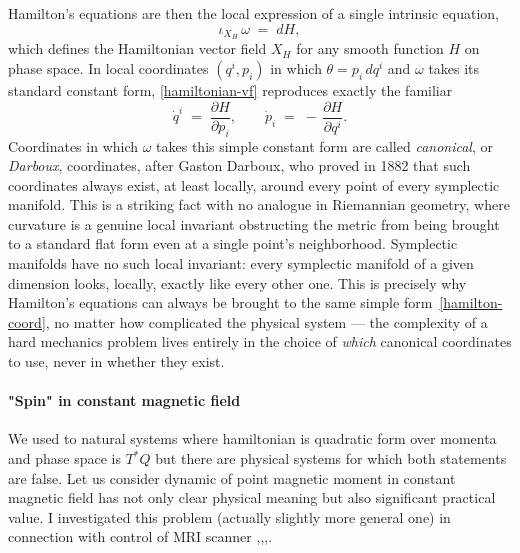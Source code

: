 Hamilton's equations are then the local expression of a single
intrinsic equation,
\begin{equation}
  \iota_{X_H}\,\omega \;=\; dH,
  \label{hamiltonian-vf}
\end{equation}
which defines the Hamiltonian vector field $X_H$ for any smooth
function $H$ on phase space. In local coordinates $(q^i,p_i)$ in
which $\theta = p_i\,dq^i$ and $\omega$ takes its standard constant
form, \eqref{hamiltonian-vf} reproduces exactly the familiar
\begin{equation}
  \dot q^i \;=\; \frac{\partial H}{\partial p_i},
  \qquad
  \dot p_i \;=\; -\,\frac{\partial H}{\partial q^i}.
  \label{hamilton-coord}
\end{equation}
Coordinates in which $\omega$ takes this simple constant form are
called \emph{canonical}, or \emph{Darboux}, coordinates, after Gaston
Darboux, who proved in 1882 that such coordinates always exist, at
least locally, around every point of every symplectic
manifold. This is a striking fact with no analogue
in Riemannian geometry, where curvature is a genuine local invariant
obstructing the metric from being brought to a standard flat form
even at a single point's neighborhood. Symplectic manifolds have no
such local invariant: every symplectic manifold of a given dimension
looks, locally, exactly like every other one. This is precisely why
Hamilton's equations can always be brought to the same simple
form~\eqref{hamilton-coord}, no matter how complicated the
physical system --- the complexity of a hard mechanics problem lives
entirely in the choice of \emph{which} canonical coordinates to use,
never in whether they exist.


\paragraph{"Spin" in constant magnetic field}
\label{par:cm-spin}
We used to natural systems where hamiltonian is quadratic form over momenta and
phase space is $T^*Q$ 
but there are physical systems for which both statements are false.
Let us consider 
dynamic of point magnetic moment in constant magnetic field has not only
clear physical meaning but also significant practical value. I investigated
this problem (actually slightly more general one) in connection with control of MRI
scanner \cite{RPZ4},\cite{RPZ3},\cite{RPZ2},\cite{RPZ1}.


